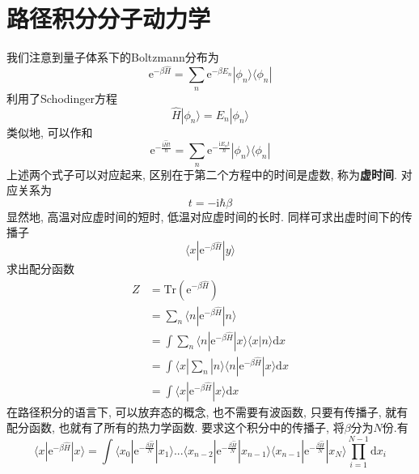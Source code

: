     \section{路径积分分子动力学}

        我们注意到量子体系下的Boltzmann分布为
        \begin{equation}
            \mathrm{e}^{-\beta \hat{H}} = \sum_n \mathrm{e}^{-\beta E_n} |\phi_n \rangle \langle \phi_n|
        \end{equation}
        利用了Schodinger方程
        \begin{equation}
            \hat{H} |\phi_n \rangle = E_n |\phi_n \rangle
        \end{equation}
        类似地, 可以作和
        \begin{equation}
            \mathrm{e}^{-\frac {\mathrm{i}\hat{H}t}{\hbar}} = \sum_n \mathrm{e}^{-\frac {\mathrm{i}E_n t}{\hbar}} |\phi_n \rangle \langle \phi_n|
        \end{equation}
        上述两个式子可以对应起来, 区别在于第二个方程中的时间是虚数, 称为\textbf{虚时间}. 对应关系为
        \begin{equation}
            t = -\mathrm{i}\hbar \beta
        \end{equation}
        显然地, 高温对应虚时间的短时, 低温对应虚时间的长时. 同样可求出虚时间下的传播子
        \begin{equation}
            \langle x|\mathrm{e}^{-\beta \hat{H}}|y\rangle
        \end{equation}
        求出配分函数
        \begin{equation}\begin{aligned}
            Z &= \mathrm{Tr}(\mathrm{e}^{-\beta \hat{H}}) \\
            &= \sum_n \langle n| \mathrm{e}^{-\beta \hat{H}}|n\rangle \\
            &= \int \sum_n \langle n| \mathrm{e}^{-\beta \hat{H}}|x \rangle \langle x|n\rangle \mathrm{d}x\\
            &= \int \langle x|\sum_n|n \rangle \langle n| \mathrm{e}^{-\beta \hat{H}}|x\rangle \mathrm{d}x\\
            &= \int \langle x|\mathrm{e}^{-\beta \hat{H}}|x\rangle \mathrm{d}x
        \end{aligned}\end{equation}
        在路径积分的语言下, 可以放弃态的概念, 也不需要有波函数, 只要有传播子, 就有配分函数, 也就有了所有的热力学函数. 要求这个积分中的传播子, 将$\beta$分为$N$份.有
        \begin{equation}
            \langle x|\mathrm{e}^{-\beta \hat{H}}|x\rangle  = \int \langle x_0|\mathrm{e}^{-\frac {\beta \hat{H}}N} |x_1 \rangle ... \langle x_{n-2}|\mathrm{e}^{-\frac {\beta \hat{H}}N} |x_{n-1} \rangle \langle x_{n-1}|\mathrm{e}^{-\frac {\beta \hat{H}}N} |x_N \rangle \prod_{i=1}^{N-1}\mathrm{d}x_i
        \end{equation}
